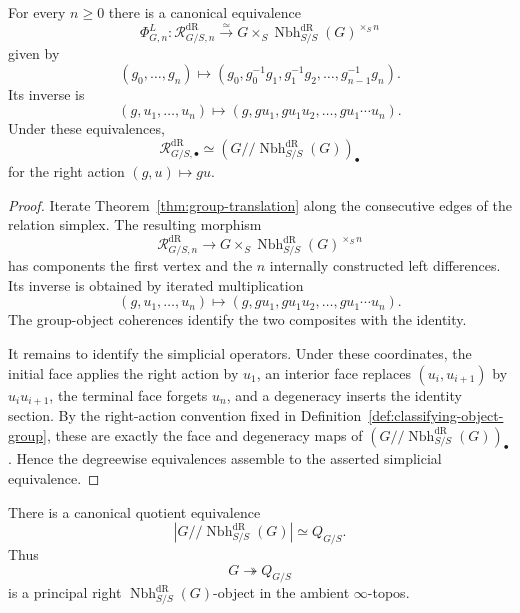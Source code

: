 \begin{theorem}
\label{thm:higher-translation-coordinates}
For every $n\geq0$ there is a canonical equivalence
\[
    \Phi^L_{G,n}:
    \mathcal R^{\mathrm{dR}}_{G/S,n}
    \xrightarrow{\simeq}
    G\times_S\operatorname{Nbh}^{\mathrm{dR}}_{S/S}(G)^{\times_S n}
\]
given by
\[
    (g_0,\ldots,g_n)
    \longmapsto
    \left(
        g_0,
        g_0^{-1}g_1,
        g_1^{-1}g_2,
        \ldots,
        g_{n-1}^{-1}g_n
    \right).
\]
Its inverse is
\[
    (g,u_1,\ldots,u_n)
    \longmapsto
    \left(
        g,
        gu_1,
        gu_1u_2,
        \ldots,
        gu_1\cdots u_n
    \right).
\]
Under these equivalences,
\[
    \mathcal R^{\mathrm{dR}}_{G/S,\bullet}
    \simeq
    (G/\!/\operatorname{Nbh}^{\mathrm{dR}}_{S/S}(G))_\bullet
\]
for the right action $(g,u)\mapsto gu$.
\end{theorem}

\begin{proof}
Iterate Theorem~\ref{thm:group-translation} along the consecutive edges of
the relation simplex.  The resulting morphism
\[
    \mathcal R^{\mathrm{dR}}_{G/S,n}
    \longrightarrow
    G\times_S\operatorname{Nbh}^{\mathrm{dR}}_{S/S}(G)^{\times_Sn}
\]
has components the first vertex and the $n$ internally constructed left
differences.  Its inverse is obtained by iterated multiplication
\[
    (g,u_1,\ldots,u_n)
    \longmapsto
    (g,gu_1,gu_1u_2,\ldots,gu_1\cdots u_n).
\]
The group-object coherences identify the two composites with the identity.

It remains to identify the simplicial operators.  Under these coordinates,
the initial face applies the right action by $u_1$, an interior face replaces
$(u_i,u_{i+1})$ by $u_iu_{i+1}$, the terminal face forgets $u_n$, and a
degeneracy inserts the identity section.  By the right-action convention fixed
in Definition~\ref{def:classifying-object-group}, these are exactly the face
and degeneracy maps of $(G/\!/\operatorname{Nbh}^{\mathrm{dR}}_{S/S}(G))_\bullet$.  Hence the degreewise
equivalences assemble to the asserted simplicial equivalence.
\end{proof}

\begin{corollary}
\label{cor:principal-formal-identity-torsor}
There is a canonical quotient equivalence
\[
    \left|G/\!/\operatorname{Nbh}^{\mathrm{dR}}_{S/S}(G)\right|
    \simeq
    Q_{G/S}.
\]
Thus
\[
    G\twoheadrightarrow Q_{G/S}
\]
is a principal right $\operatorname{Nbh}^{\mathrm{dR}}_{S/S}(G)$-object in the ambient $\infty$-topos.
\end{corollary}

